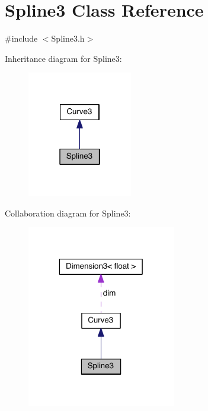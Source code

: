 \hypertarget{class_spline3}{\section{Spline3 Class Reference}
\label{class_spline3}
}


{\ttfamily \#include $<$Spline3.\-h$>$}



Inheritance diagram for Spline3\-:
\nopagebreak
\begin{figure}[H]
\begin{center}
\leavevmode
\includegraphics[width=130pt]{class_spline3__inherit__graph}
\end{center}
\end{figure}


Collaboration diagram for Spline3\-:
\nopagebreak
\begin{figure}[H]
\begin{center}
\leavevmode
\includegraphics[width=184pt]{class_spline3__coll__graph}
\end{center}
\end{figure}

